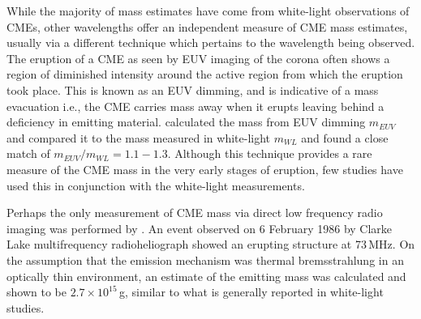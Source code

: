 While the majority of mass estimates have come from white-light observations of CMEs, other wavelengths offer an independent measure of CME mass estimates, usually via a different technique which pertains to the wavelength being observed. The eruption of a CME as seen by EUV imaging of the corona often shows a region of diminished intensity around the active region from which the eruption took place. This is known as an EUV dimming, and is indicative of a mass evacuation i.e., the CME carries mass away when it erupts leaving behind a deficiency in emitting material.  
\citet{aschw09} calculated the mass from EUV dimming $m_{EUV}$ and compared it to the mass measured in white-light $m_{WL}$ and found a close match of $m_{EUV}/m_{WL}=1.1 -1.3$. Although this technique provides a rare measure of the CME mass in the very early stages of eruption, few studies have used this in conjunction with the white-light measurements.

Perhaps the only measurement of CME mass via direct low frequency radio imaging was performed by \citet{gopalswamy1992}. An event observed on 6 February 1986 by Clarke Lake multifrequency radioheliograph showed an erupting structure at 73\,MHz. On the assumption that the emission mechanism was thermal bremsstrahlung in an optically thin environment, an estimate of the emitting mass was calculated and shown to be $2.7\times10^{15}$\,g, similar to what is generally reported in white-light studies. 



